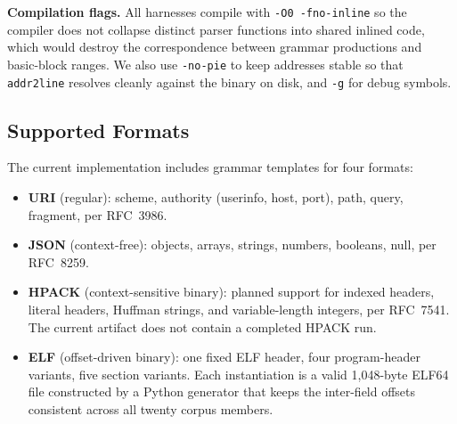 \textbf{Compilation flags.}
All harnesses compile with \texttt{-O0 -fno-inline} so the compiler does not collapse distinct parser functions into shared inlined code, which would destroy the correspondence between grammar productions and basic-block ranges.
We also use \texttt{-no-pie} to keep addresses stable so that \texttt{addr2line} resolves cleanly against the binary on disk, and \texttt{-g} for debug symbols.

\subsection{Supported Formats}\label{sec:impl:formats}

The current implementation includes grammar templates for four formats:

\begin{itemize}
    \item \textbf{URI} (regular): scheme, authority (userinfo, host, port), path, query, fragment, per RFC~3986.
    \item \textbf{JSON} (context-free): objects, arrays, strings, numbers, booleans, null, per RFC~8259.
    \item \textbf{HPACK} (context-sensitive binary): planned support for indexed headers, literal headers, Huffman strings, and variable-length integers, per RFC~7541. The current artifact does not contain a completed HPACK run.
    \item \textbf{ELF} (offset-driven binary): one fixed ELF header, four program-header variants, five section variants. Each instantiation is a valid 1{,}048-byte ELF64 file constructed by a Python generator that keeps the inter-field offsets consistent across all twenty corpus members.
\end{itemize}
